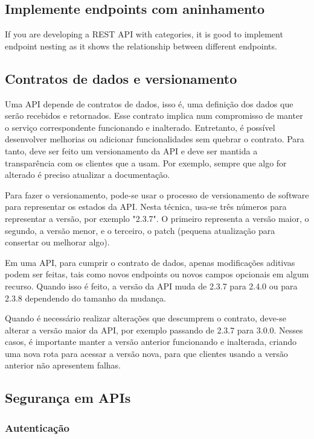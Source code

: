 \subsection{Implemente endpoints com aninhamento}
If you are developing a REST API with categories, it is good to implement endpoint nesting as it shows the relationship between different endpoints. \cite{rapidAPI-twitter}

\subsection{Contratos de dados e versionamento}
Uma API depende de contratos de dados, isso é, uma definição dos dados que serão recebidos e retornados. Esse contrato implica num compromisso de manter o serviço correspondente funcionando e inalterado. Entretanto, é possível desenvolver melhorias ou adicionar funcionalidades sem quebrar o contrato. Para tanto, deve ser feito um versionamento da API e deve ser mantida a transparência com os clientes que a usam. Por exemplo, sempre que algo for alterado é preciso atualizar a documentação.

Para fazer o versionamento, pode-se usar o processo de versionamento de software para representar os estados da API. Nesta técnica, usa-se três números para representar a versão, por exemplo "2.3.7". O primeiro representa a versão maior, o segundo, a versão menor, e o terceiro, o patch (pequena atualização para consertar ou melhorar algo). \cite{wiki_software_versioning_2022}

Em uma API, para cumprir o contrato de dados, apenas modificações aditivas podem ser feitas, tais como novos endpoints ou novos campos opcionais em algum recurso. Quando isso é feito, a versão da API muda de 2.3.7 para 2.4.0 ou para 2.3.8 dependendo do tamanho da mudança.

Quando é necessário realizar alterações que descumprem o contrato, deve-se alterar a versão maior da API, por exemplo passando de 2.3.7 para 3.0.0. Nesses casos, é importante manter a versão anterior funcionando e inalterada, criando uma nova rota para acessar a versão nova, para que clientes usando a versão anterior não apresentem falhas.

\subsection{Segurança em APIs}

\subsubsection*{Autenticação}

